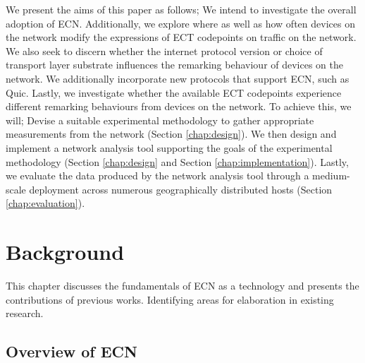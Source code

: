 \documentclass{l4proj}
\begin{document}
We present the aims of this paper as follows; We intend to investigate the overall adoption of ECN. Additionally, we explore where as well as how often devices on the network modify the expressions of ECT codepoints on traffic on the network. We also seek to discern whether the internet protocol version or choice of transport layer substrate influences the remarking behaviour of devices on the network. We additionally incorporate new protocols that support ECN, such as Quic. Lastly, we investigate whether the available ECT codepoints experience different remarking behaviours from devices on the network. To achieve this, we will; Devise a suitable experimental methodology to gather appropriate measurements from the network (Section \ref{chap:design}). We then design and implement a network analysis tool supporting the goals of the experimental methodology (Section \ref{chap:design} and Section \ref{chap:implementation}). Lastly, we evaluate the data produced by the network analysis tool through a medium-scale deployment across numerous geographically distributed hosts (Section \ref{chap:evaluation}).

\clearpage


\chapter{Background}

This chapter discusses the fundamentals of ECN as a technology and presents the contributions of previous works. Identifying areas for elaboration in existing research.

\section{Overview of ECN}


\end{document}
